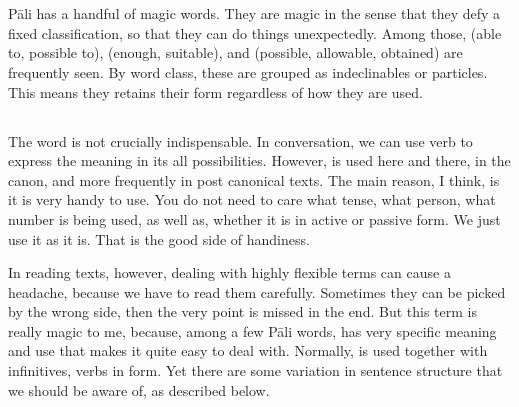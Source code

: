 \chapter{}\label{chap:sakkaa}

P\=ali has a handful of magic words. They are magic in the sense that they defy a fixed classification, so that they can do things unexpectedly. Among those,  (able to, possible to),  (enough, suitable), and  (possible, allowable, obtained) are frequently seen. By word class, these are grouped as indeclinables or particles. This means they retains their form regardless of how they are used.

\section*{}

The word is not crucially indispensable. In conversation, we can use verb  to express the meaning in its all possibilities. However,  is used here and there, in the canon, and more frequently in post canonical texts. The main reason, I think, is it is very handy to use. You do not need to care what tense, what person, what number is being used, as well as, whether it is in active or passive form. We just use it as it is. That is the good side of handiness.

In reading texts, however, dealing with highly flexible terms can cause a headache, because we have to read them carefully. Sometimes they can be picked by the wrong side, then the very point is missed in the end. But this term is really magic to me, because, among a few P\=ali words,  has very specific meaning and use that makes it quite easy to deal with. Normally,  is used together with infinitives, verbs in  form. Yet there are some variation in sentence structure that we should be aware of, as described below.

